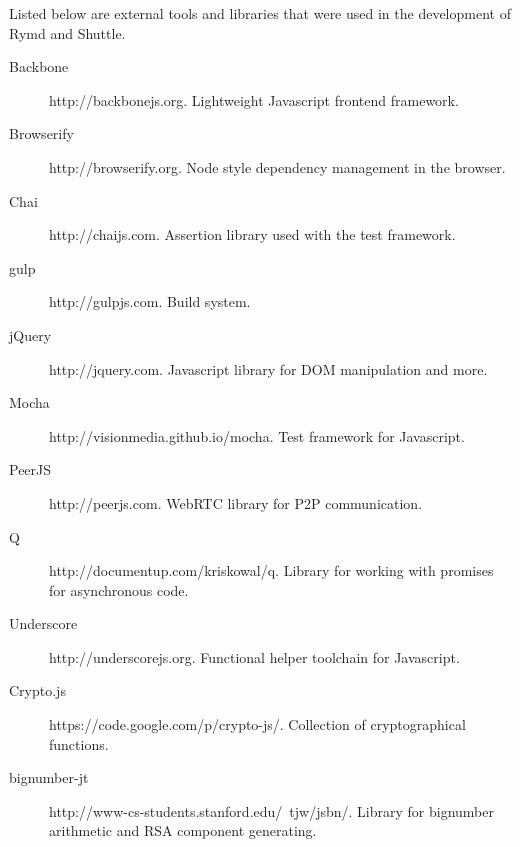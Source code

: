 Listed below are external tools and libraries that were used in the development of Rymd and Shuttle.

\begin{description}
  \item[Backbone] http://backbonejs.org. Lightweight Javascript frontend framework.
  \item[Browserify] http://browserify.org. Node style dependency management in the browser.
  \item[Chai] http://chaijs.com. Assertion library used with the test framework.
  \item[gulp] http://gulpjs.com. Build system.
  \item[jQuery] http://jquery.com. Javascript library for DOM manipulation and more.
  \item[Mocha] http://visionmedia.github.io/mocha. Test framework for Javascript.
  \item[PeerJS] http://peerjs.com. WebRTC library for P2P communication.
  \item[Q] http://documentup.com/kriskowal/q. Library for working with promises for asynchronous code.
  \item[Underscore] http://underscorejs.org. Functional helper toolchain for Javascript.
  \item[Crypto.js] https://code.google.com/p/crypto-js/. Collection of cryptographical functions.
  \item[bignumber-jt] http://www-cs-students.stanford.edu/~tjw/jsbn/. Library for bignumber arithmetic and RSA component generating.
\end{description}
